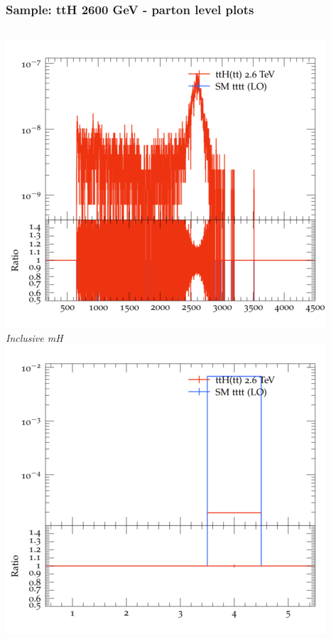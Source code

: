 \documentclass{beamer}
\begin{document}
\begin{frame}
\frametitle{Sample: ttH 2600 GeV - parton level plots}
\begin{columns}
\includegraphics[width=\textwidth]{../plots/ttH_2600/tttt_ttH/Inclusive_mH.png}\\
\textit{\small Inclusive mH}
\includegraphics[width=\textwidth]{../plots/ttH_2600/tttt_ttH/Inclusive_nTop.png}\\

\end{columns}
\end{frame}
\end{document}
